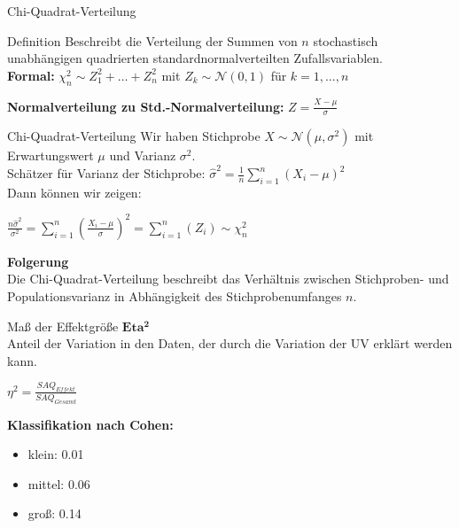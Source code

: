\documentclass{beamer}
\begin{document}
	\begin{frame}{Chi-Quadrat-Verteilung}
		\begin{block}{Definition}
			Beschreibt die Verteilung der Summen von $n$ stochastisch unabhängigen quadrierten standardnormalverteilten Zufallsvariablen. \\ \vspace{2 ex}
			\textbf{Formal:} $\chi_n^2 \sim Z_1^2+ \dots + Z_n^2 $ mit $Z_k \sim \mathcal{N}(0,1)$ für $k=1, \dots , n$
		\end{block}
			\textbf{Normalverteilung zu Std.-Normalverteilung:} $Z = \frac{X-\mu}{\sigma}$ 
	\end{frame}
	
	\begin{frame}{Chi-Quadrat-Verteilung}
		Wir haben Stichprobe $X\sim \mathcal{N}(\mu,\sigma^2)$ mit Erwartungswert $\mu$ und Varianz $\sigma^2$.\\ \vspace{1ex} 
		Schätzer für Varianz der Stichprobe: $\hat{\sigma}^2 = \frac{1}{n} \sum_{i=1}^{n}(X_i-\mu)^2$ \\ \vspace{2ex}
		Dann können wir zeigen: \\
		\begin{center}
			$\frac{n\hat{\sigma}^2}{\sigma^2} = \sum_{i=1}^{n}(\frac{X_i-\mu}{\sigma})^2 =  \sum_{i=1}^{n}(Z_i) \sim \chi^2_n$
		\end{center}
		\textbf{Folgerung}\\
		Die Chi-Quadrat-Verteilung beschreibt das Verhältnis zwischen Stichproben- und Populationsvarianz in Abhängigkeit des Stichprobenumfanges $n$.
	\end{frame}
	
	
	\begin{frame}{Maß der Effektgröße}
		$\mathbf{Eta^2}$\\
		Anteil der Variation in den Daten, der durch die Variation der UV erklärt werden kann.\\
		\begin{center}
			$\eta^2 = \frac{SAQ_{Effekt}}{SAQ_{Gesamt}}$ 
		\end{center}
		\textbf{Klassifikation nach Cohen:}
		\begin{itemize}
			\item klein: 0.01
			\item mittel: 0.06
			\item groß: 0.14
		\end{itemize}
		
	\end{frame}
	
\end{document}

